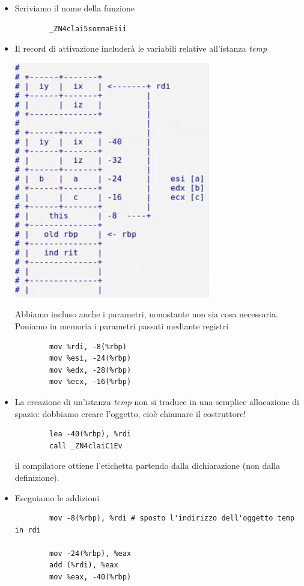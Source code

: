 \begin{itemize}
	\item Scriviamo il nome della funzione
	\begin{verbatim}
		_ZN4clai5sommaEiii
	\end{verbatim}
	\item Il record di attivazione includerà le variabili relative all'istanza \emph{temp}
	\begin{center}
		\includegraphics{img/41.PNG}
	\end{center}  
	Abbiamo incluso anche i parametri, nonostante non sia cosa necessaria. Poniamo in memoria i parametri passati mediante registri
	\begin{verbatim}
		mov %rdi, -8(%rbp)
		mov %esi, -24(%rbp)
		mov %edx, -28(%rbp)
		mov %ecx, -16(%rbp)
	\end{verbatim}
	\item La creazione di un'istanza \emph{temp} non si traduce in una semplice allocazione di spazio: dobbiamo creare l'oggetto, cioè chiamare il costruttore!
	\begin{verbatim}
		lea -40(%rbp), %rdi
		call _ZN4claiC1Ev
	\end{verbatim}
	il compilatore ottiene l'etichetta partendo dalla dichiarazione (non dalla definizione).
	\item Eseguiamo le addizioni
	\begin{verbatim}
		mov -8(%rbp), %rdi # sposto l'indirizzo dell'oggetto temp in rdi
		
		mov -24(%rbp), %eax 
		add (%rdi), %eax 
		mov %eax, -40(%rbp)
		

\end{verbatim}
\end{itemize}
